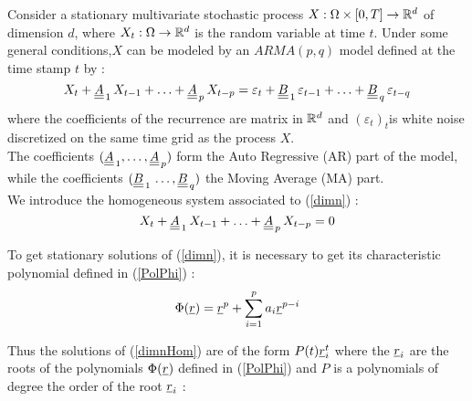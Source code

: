 \renewcommand{\filename}{docUC_StocProc_NormalIntro.tex}
\renewcommand{\filetitle}{Intro}







Consider a stationary multivariate stochastic process $X: \Omega \times[0,T] \rightarrow {\mathbb R}^d$  of dimension $d$, where $X_t : \Omega \rightarrow {\mathbb R}^d$ is the random variable at time $t$.
Under some general conditions,$X$ can be modeled by an  $ARMA(p,q)$ model defined at the time stamp $t$ by :
\begin{equation}\label{dimn}
  X_t + {\underline{\underline{A}}}_{\, 1}   \, X_{t-1} + \hdots +  {\underline{\underline{A}}}_{\, p} \,   X_{t-p} =
  \varepsilon_{t}+  {\underline{\underline{B}}}_ {\, 1} \,  \varepsilon_{t-1}+   \hdots + {\underline{\underline{B}}}_{\, q}  \, \varepsilon_{t-q}
\end{equation}
where the coefficients of the recurrence are  matrix in ${\mathbb R}^d$ and $(\varepsilon_t)_t$is white noise discretized on the same time grid as the process $X$.\\
The coefficients $({\underline{\underline{A}}}_{\, 1} , \hdots, {\underline{\underline{A}}}_{\, p} )$ form the Auto Regressive (AR) part of the model, while the coefficients $({\underline{\underline{B}}}_{\, 1} \, \hdots, {\underline{\underline{B}}}_{\, q}  )$ the Moving Average (MA) part. \\

We introduce the homogeneous system associated to (\ref{dimn}) :
\begin{equation}\label{dimnHom}
  X_t + {\underline{\underline{A}}}_{\, 1}   \,  X_{t-1} + \hdots +  {\underline{\underline{A}}}_{\, p} \,  X_{t-p} = 0
\end{equation}


To get stationary solutions of (\ref{dimn}), it is necessary to get its characteristic polynomial defined in (\ref{PolPhi}) :
\begin{equation}\label{PolPhi}
  \Phi({\underline{r}}) = {\underline{r}}^p + \sum_{i=1}^p a_i{\underline{r}}^{p-i}
\end{equation}


Thus the solutions of (\ref{dimnHom}) are of the form $P(t){\underline{r}}_i^t$ where the ${\underline{r}}_i$ are the roots of the polynomials $\Phi({\underline{r}})$ defined in (\ref{PolPhi}) and $P$ is a polynomials of degree the order of the root ${\underline{r}}_i$ :


